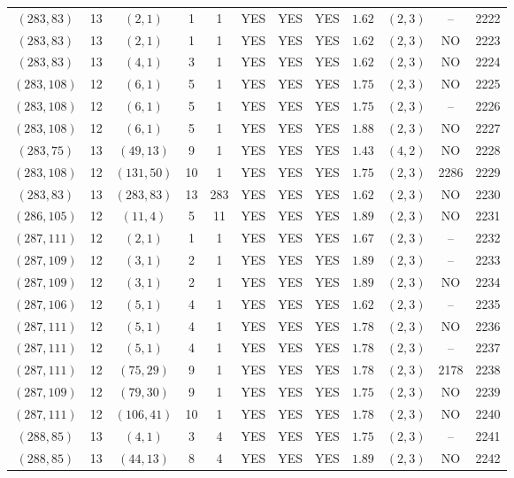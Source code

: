 \begin{longtable}{|c|c|c|c|c|c|c|c|c|c|c|c|}
$(283,83)$ & 13 & $(2,1)$ & 1 & 1 & YES & YES & YES & $1.62$ & $(2,3)$ & -- & 2222\\
$(283,83)$ & 13 & $(2,1)$ & 1 & 1 & YES & YES & YES & $1.62$ & $(2,3)$ & NO & 2223\\
$(283,83)$ & 13 & $(4,1)$ & 3 & 1 & YES & YES & YES & $1.62$ & $(2,3)$ & NO & 2224\\
$(283,108)$ & 12 & $(6,1)$ & 5 & 1 & YES & YES & YES & $1.75$ & $(2,3)$ & NO & 2225\\
$(283,108)$ & 12 & $(6,1)$ & 5 & 1 & YES & YES & YES & $1.75$ & $(2,3)$ & -- & 2226\\
$(283,108)$ & 12 & $(6,1)$ & 5 & 1 & YES & YES & YES & $1.88$ & $(2,3)$ & NO & 2227\\
$(283,75)$ & 13 & $(49,13)$ & 9 & 1 & YES & YES & YES & $1.43$ & $(4,2)$ & NO & 2228\\
$(283,108)$ & 12 & $(131,50)$ & 10 & 1 & YES & YES & YES & $1.75$ & $(2,3)$ & 2286 & 2229\\
$(283,83)$ & 13 & $(283,83)$ & 13 & 283 & YES & YES & YES & $1.62$ & $(2,3)$ & NO & 2230\\
$(286,105)$ & 12 & $(11,4)$ & 5 & 11 & YES & YES & YES & $1.89$ & $(2,3)$ & NO & 2231\\
$(287,111)$ & 12 & $(2,1)$ & 1 & 1 & YES & YES & YES & $1.67$ & $(2,3)$ & -- & 2232\\
$(287,109)$ & 12 & $(3,1)$ & 2 & 1 & YES & YES & YES & $1.89$ & $(2,3)$ & -- & 2233\\
$(287,109)$ & 12 & $(3,1)$ & 2 & 1 & YES & YES & YES & $1.89$ & $(2,3)$ & NO & 2234\\
$(287,106)$ & 12 & $(5,1)$ & 4 & 1 & YES & YES & YES & $1.62$ & $(2,3)$ & -- & 2235\\
$(287,111)$ & 12 & $(5,1)$ & 4 & 1 & YES & YES & YES & $1.78$ & $(2,3)$ & NO & 2236\\
$(287,111)$ & 12 & $(5,1)$ & 4 & 1 & YES & YES & YES & $1.78$ & $(2,3)$ & -- & 2237\\
$(287,111)$ & 12 & $(75,29)$ & 9 & 1 & YES & YES & YES & $1.78$ & $(2,3)$ & 2178 & 2238\\
$(287,109)$ & 12 & $(79,30)$ & 9 & 1 & YES & YES & YES & $1.75$ & $(2,3)$ & NO & 2239\\
$(287,111)$ & 12 & $(106,41)$ & 10 & 1 & YES & YES & YES & $1.78$ & $(2,3)$ & NO & 2240\\
$(288,85)$ & 13 & $(4,1)$ & 3 & 4 & YES & YES & YES & $1.75$ & $(2,3)$ & -- & 2241\\
$(288,85)$ & 13 & $(44,13)$ & 8 & 4 & YES & YES & YES & $1.89$ & $(2,3)$ & NO & 2242\\

\end{longtable}
